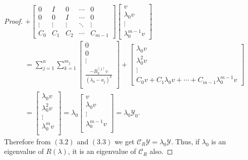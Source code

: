 \documentclass[12pt, reqno]{amsart}
\theoremstyle{definition}
\theoremstyle{remark}
\numberwithin{equation}{section}
\begin{document}
\begin{proof}
$+ \begin{bmatrix}
0 & I & 0 & \cdots & 0\\
0 & 0 & I & \cdots & 0\\
\vdots & \vdots & \vdots & \ddots & \vdots\\
C_0 & C_1 & C_2 & \cdots & C_{m-1}  
\end{bmatrix}\begin{bmatrix}
v\\
\lambda_0v\\
\vdots\\
\lambda_0^{m-1}v
\end{bmatrix}$ \\
\begin{align}
& = \sum_{j=1}^{n} \sum_{k=1}^{m_j} \begin{bmatrix}
0\\
0\\
\vdots\\
\frac{-B_k^{(j)}v}{(\lambda_0-a_j)^k}\\
\end{bmatrix}+\begin{bmatrix}
\lambda_0v\\
\lambda_0^2v\\
\vdots\\
C_0v+C_1\lambda_0v+ \cdots + C_{m-1}\lambda_0^{m-1}v
\end{bmatrix} \nonumber\\ 
& =\begin{bmatrix}
\lambda_0v\\
\lambda_0^2v\\
\vdots\\
\lambda_0^mv\\
\end{bmatrix}
=\lambda_0 \begin{bmatrix}
v\\
\lambda_0v\\
\vdots\\
\lambda_0^{m-1}v\\
\end{bmatrix}=\lambda_0\mathcal{Y}_0.
\end{align}
Therefore from $(3.2)$ and $(3.3)$ we get $\mathcal{C}_R \mathcal{Y} 
= \lambda_0 \mathcal{Y}$. Thus, if $\lambda_0$ is an eigenvalue of $R(\lambda)$, 
it is an eigenvalue of $\mathcal{C}_R$ also.
\end{proof}
\end{document}
